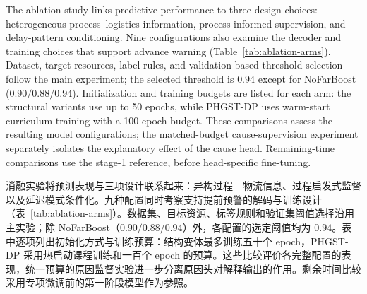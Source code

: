 \documentclass[a4paper,fleqn]{cas-dc}
\newcommand{\zhpara}[1]{%
  \par\begingroup\small\color{black!72}\noindent #1\par\endgroup}
\begin{document}
The ablation study links predictive performance to three design choices: heterogeneous process--logistics information, process-informed supervision, and delay-pattern conditioning. Nine configurations also examine the decoder and training choices that support advance warning (Table~\ref{tab:ablation-arms}). Dataset, target resources, label rules, and validation-based threshold selection follow the main experiment; the selected threshold is $0.94$ except for NoFarBoost ($0.90/0.88/0.94$). Initialization and training budgets are listed for each arm: the structural variants use up to 50 epochs, while PHGST-DP uses warm-start curriculum training with a 100-epoch budget. These comparisons assess the resulting model configurations; the matched-budget cause-supervision experiment separately isolates the explanatory effect of the cause head. Remaining-time comparisons use the stage-1 reference, before head-specific fine-tuning.

\zhpara{消融实验将预测表现与三项设计联系起来：异构过程—物流信息、过程启发式监督以及延迟模式条件化。九种配置同时考察支持提前预警的解码与训练设计（表~\ref{tab:ablation-arms}）。数据集、目标资源、标签规则和验证集阈值选择沿用主实验；除 NoFarBoost（$0.90/0.88/0.94$）外，各配置的选定阈值均为 $0.94$。表中逐项列出初始化方式与训练预算：结构变体最多训练五十个 epoch，PHGST-DP 采用热启动课程训练和一百个 epoch 的预算。这些比较评价各完整配置的表现，统一预算的原因监督实验进一步分离原因头对解释输出的作用。剩余时间比较采用专项微调前的第一阶段模型作为参照。}
\end{document}
